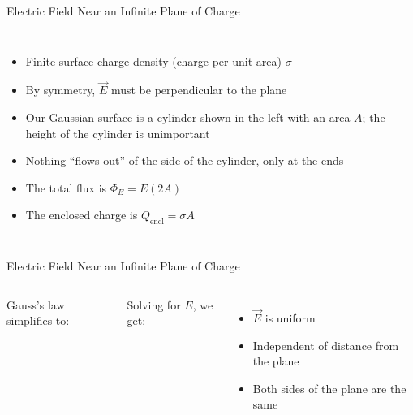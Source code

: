 \documentclass[12pt,aspectratio=169]{beamer}
\begin{document}
\begin{frame}{Electric Field Near an Infinite Plane of Charge}
  \begin{columns}

    \begin{itemize}
    \item Finite surface charge density (charge per unit area) $\sigma$
    \item By symmetry, $\vec E$ must be perpendicular to the plane
    \item Our Gaussian surface is a cylinder shown in the left with an area
      $A$; the height of the cylinder is unimportant
    \item Nothing ``flows out'' of the side of the cylinder, only at the ends
    \item The total flux is $\Phi_E=E(2A)$
    \item The enclosed charge is $Q_\text{encl}=\sigma A$
    \end{itemize}
  \end{columns}
\end{frame}



\begin{frame}{Electric Field Near an Infinite Plane of Charge}
  \begin{columns}

    Gauss's law simplifies to:
    

    Solving for $E$, we get:

    \begin{itemize}
    \item $\vec E$ is uniform
    \item Independent of distance from the plane
    \item Both sides of the plane are the same
    \end{itemize}
  \end{columns}
\end{frame}
\end{document}

